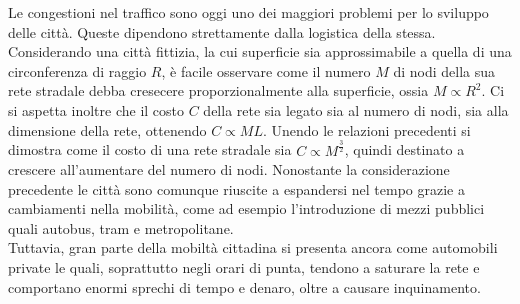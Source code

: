 \documentclass[../main.tex]{subfiles}
\begin{document}
Le congestioni nel traffico sono oggi uno dei maggiori problemi per lo sviluppo delle citt\`a.
Queste dipendono strettamente dalla logistica della stessa.
Considerando una citt\`a fittizia, la cui superficie sia approssimabile a quella di una circonferenza di raggio $R$, \`e facile osservare come il numero $M$ di nodi della sua rete stradale debba cresecere proporzionalmente alla superficie, ossia $M\propto R^2$.
Ci si aspetta inoltre che il costo $C$ della rete sia legato sia al numero di nodi, sia alla dimensione della rete, ottenendo $C\propto ML$.
Unendo le relazioni precedenti si dimostra come il costo di una rete stradale sia $C\propto M^\frac{3}{2}$, quindi destinato a crescere all'aumentare del numero di nodi.
Nonostante la considerazione precedente le città sono comunque riuscite a espandersi nel tempo grazie a cambiamenti nella mobilit\`a, come ad esempio l'introduzione di mezzi pubblici quali autobus, tram e metropolitane.
\\Tuttavia, gran parte della mobiltà cittadina si presenta ancora come automobili private le quali, soprattutto negli orari di punta, tendono a saturare la rete e comportano enormi sprechi di tempo e denaro, oltre a causare inquinamento.
\end{document}

